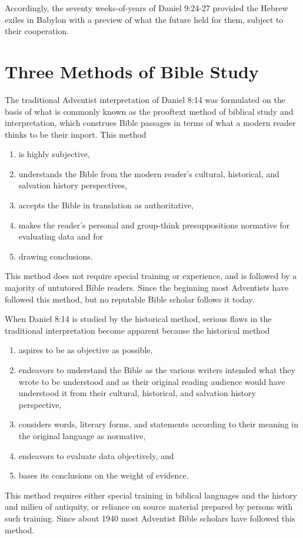 Accordingly, the seventy weeks-of-years of Daniel 9:24-27 provided the
Hebrew exiles in Babylon with a preview of what the future held for them, 
subject to their cooperation.

\section{Three Methods of Bible Study}

The traditional Adventist interpretation of Daniel 8:14 was formulated on
the basis of what is commonly known as the prooftext method of biblical
study and interpretation, which construes Bible passages in terms of what a
modern reader thinks to be their import. This method
\begin{enumerate}
    \item is highly
subjective,
    \item understands the Bible from the modern reader's cultural,
historical, and salvation history perspectives,
    \item accepts the Bible in
translation as authoritative,
    \item makes the reader's personal and
group-think presuppositions normative for evaluating data and for
    \item
drawing conclusions.
\end{enumerate}
This method does not require special training or
experience, and is followed by a majority of untutored Bible readers. Since
the beginning most Adventists have followed this method, but no reputable
Bible scholar follows it today. 

When Daniel 8:14 is studied by the historical method, serious flaws in the
traditional interpretation become apparent because the historical method
\begin{enumerate}
    \item
aspires to be as objective as possible,
    \item endeavors to understand the
Bible as the various writers intended what they wrote to be understood and
as their original reading audience would have understood it from their
cultural, historical, and salvation history perspective,
    \item considers
words, literary forms, and statements according to their meaning in the
original language as normative,
    \item endeavors to evaluate data objectively,
and
    \item bases its conclusions on the weight of evidence.
\end{enumerate}
This method
requires either special training in biblical languages and the history and
milieu of antiquity, or reliance on source material prepared by persons with
such training. Since about 1940 most Adventist Bible scholars have followed
this method.

